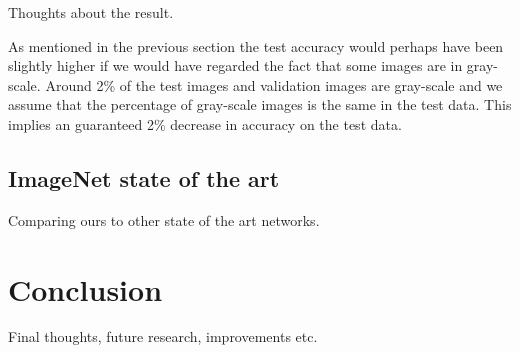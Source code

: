 \documentclass{kthreport}
\begin{document}
Thoughts about the result.

As mentioned in the previous section the test accuracy would perhaps have been slightly higher if we would have regarded the fact that some images are in gray-scale. Around 2\% of the test images and validation images are gray-scale and we assume that the percentage of gray-scale images is the same in the test data. This implies an guaranteed 2\% decrease in accuracy on the test data.

\subsection{ImageNet state of the art}

Comparing ours to other state of the art networks.

\section{Conclusion}
Final thoughts, future research, improvements etc.

{}

\end{document}
